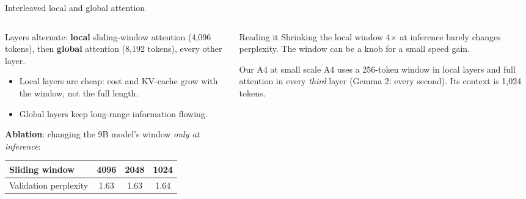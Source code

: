 \documentclass[aspectratio=169,11pt]{beamer}
\begin{document}
\begin{frame}{Interleaved local and global attention}
  \begin{columns}[T]
    \begin{column}{0.52\textwidth}
      \small
      Layers alternate: \textbf{local} sliding-window attention (4,096 tokens), then \textbf{global} attention (8,192 tokens), every other layer.
      \begin{itemize}
        \item Local layers are cheap: cost and KV-cache grow with the window, not the full length.
        \item Global layers keep long-range information flowing.
      \end{itemize}
      \vspace{1mm}
      \textbf{Ablation}: changing the 9B model's window \emph{only at inference}:
      \vspace{1mm}

      \begin{tabular}{@{}lccc@{}}
        \toprule
        Sliding window & 4096 & 2048 & 1024\\
        \midrule
        Validation perplexity & 1.63 & 1.63 & 1.64\\
        \bottomrule
      \end{tabular}
    \end{column}
    \begin{column}{0.44\textwidth}
      \begin{exampleblock}{Reading it}
        \small
        Shrinking the local window 4$\times$ at inference barely changes perplexity. The window can be a knob for a small speed gain.
      \end{exampleblock}
      \begin{block}{Our A4 at small scale}
        \small
        A4 uses a 256-token window in local layers and full attention in every \emph{third} layer (Gemma 2: every second). Its context is 1,024 tokens.
      \end{block}
    \end{column}
  \end{columns}
\end{frame}
\end{document}
